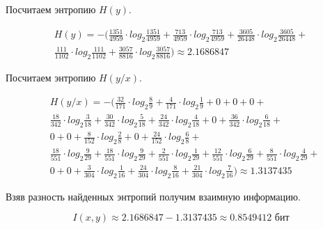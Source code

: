 \documentclass[a4paper,12pt]{article}
\begin{document}
\newpage

Посчитаем энтропию $H(y)$.

\begin{gather*}
H(y) = - \biggl( \frac{1351}{4959} \cdot log_{2} \frac{1351}{4959} + \frac{713}{4959} \cdot log_{2} \frac{713}{4959} + \frac{3605}{26448} \cdot log_{2} \frac{3605}{26448} + \\
\frac{111}{1102} \cdot log_{2} \frac{111}{1102} + \frac{3057}{8816} \cdot log_{2} \frac{3057}{8816} \biggr) \approx 2.1686847
\end{gather*}

Посчитаем энтропию $H(y / x)$.

\begin{align*}
& H(y / x) = - \biggl( \frac{32}{171} \cdot log_{2} \frac{8}{9} + \frac{4}{171} \cdot log_{2} \frac{1}{9} + 0 + 0 + 0 + \\
& \frac{18}{342} \cdot log_{2} \frac{3}{18} + \frac{30}{342} \cdot log_{2} \frac{5}{18} + \frac{24}{342} \cdot log_{2} \frac{4}{18} + 0 + \frac{36}{342} \cdot log_{2} \frac{6}{18} + \\
& 0 + 0 + \frac{8}{152} \cdot log_{2} \frac{2}{8} + 0 + \frac{24}{152} \cdot log_{2} \frac{6}{8} + \\
& \frac{18}{551} \cdot log_{2} \frac{9}{29} + \frac{18}{551} \cdot log_{2} \frac{9}{29} + \frac{2}{551} \cdot log_{2} \frac{1}{29} + \frac{12}{551} \cdot log_{2} \frac{6}{29} + \frac{8}{551} \cdot log_{2} \frac{4}{29} + \\
& 0 + 0 + \frac{3}{304} \cdot log_{2} \frac{1}{16} + \frac{24}{304} \cdot log_{2} \frac{8}{16} + \frac{21}{304} \cdot log_{2} \frac{7}{16} \biggr) \approx 1.3137435
\end{align*}

Взяв разность найденных энтропий получим взаимную информацию.

$$I(x, y) \approx 2.1686847 - 1.3137435 \approx 0.8549412 \text{ бит}$$

\newpage
\end{document}
